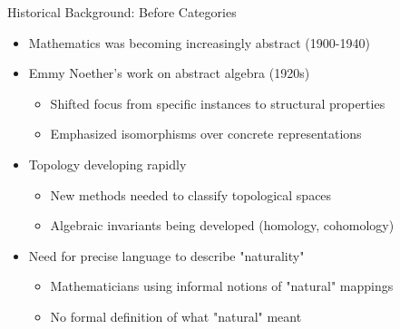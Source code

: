 \documentclass{beamer}
\begin{document}
\begin{frame}{Historical Background: Before Categories}
    \begin{itemize}
        \item Mathematics was becoming increasingly abstract (1900-1940)
        \item Emmy Noether's work on abstract algebra (1920s)
            \begin{itemize}
                \item Shifted focus from specific instances to structural properties
                \item Emphasized isomorphisms over concrete representations
            \end{itemize}
        \item Topology developing rapidly
            \begin{itemize}
                \item New methods needed to classify topological spaces
                \item Algebraic invariants being developed (homology, cohomology)
            \end{itemize}
        \item Need for precise language to describe "naturality"
            \begin{itemize}
                \item Mathematicians using informal notions of "natural" mappings
                \item No formal definition of what "natural" meant
            \end{itemize}
    \end{itemize}
\end{frame}
\end{document}
